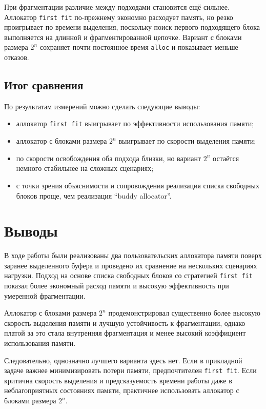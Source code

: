 \documentclass[unicode, 12pt, a4paper, oneside, fleqn]{article}
\begin{document}
При фрагментации различие между подходами становится ещё сильнее. Аллокатор \texttt{first fit} по-прежнему экономно расходует память, но резко проигрывает по времени выделения, поскольку поиск первого подходящего блока выполняется на длинной и фрагментированной цепочке. Вариант с блоками размера $2^n$ сохраняет почти постоянное время \texttt{alloc} и показывает меньше отказов.

\subsection{Итог сравнения}

По результатам измерений можно сделать следующие выводы:
\begin{itemize}[leftmargin=1.5cm]
\item аллокатор \texttt{first fit} выигрывает по эффективности использования памяти;
\item аллокатор с блоками размера $2^n$ выигрывает по скорости выделения памяти;
\item по скорости освобождения оба подхода близки, но вариант $2^n$ остаётся немного стабильнее на сложных сценариях;
\item с точки зрения объяснимости и сопровождения реализация списка свободных блоков проще, чем реализация \enquote{buddy allocator}.
\end{itemize}

\section{Выводы}

В ходе работы были реализованы два пользовательских аллокатора памяти поверх заранее выделенного буфера и проведено их сравнение на нескольких сценариях нагрузки. Подход на основе списка свободных блоков со стратегией \texttt{first fit} показал более экономный расход памяти и высокую эффективность при умеренной фрагментации.

Аллокатор с блоками размера $2^n$ продемонстрировал существенно более высокую скорость выделения памяти и лучшую устойчивость к фрагментации, однако платой за это стала внутренняя фрагментация и менее высокий коэффициент использования памяти.

Следовательно, однозначно лучшего варианта здесь нет. Если в прикладной задаче важнее минимизировать потери памяти, предпочтителен \texttt{first fit}. Если критична скорость выделения и предсказуемость времени работы даже в неблагоприятных состояниях памяти, практичнее использовать аллокатор с блоками размера $2^n$.
\end{document}
